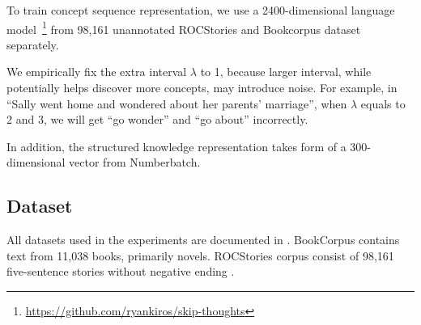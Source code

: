 To train concept sequence representation,  
we use a 2400-dimensional language model~\cite{kiros2015skip}\footnote{\url{https://github.com/ryankiros/skip-thoughts}} 
from 98,161 unannotated ROCStories and Bookcorpus dataset~\cite{zhu2015aligning} separately. 

We empirically fix the extra interval $\lambda$ to 1, 
because larger interval, while potentially helps discover more
concepts, may introduce noise. 
For example, in 
``Sally went home and wondered about her parents' marriage'', 
when $\lambda$ equals to 2 and 3, we will get ``go wonder'' and 
``go about'' incorrectly.

In addition, the structured knowledge representation takes form of a 
300-dimensional vector from Numberbatch. 
\subsection{Dataset}
\label{sec:dataset}

All datasets used in the experiments are documented in 
. BookCorpus contains text from
11,038 books, primarily novels.  
ROCStories corpus consist of 98,161 five-sentence 
stories without negative ending . 

